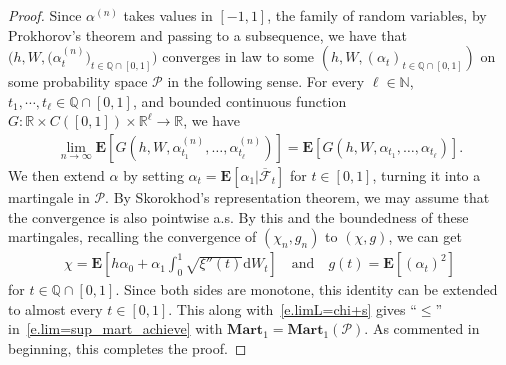 \documentclass[11pt]{amsart}
\theoremstyle{remark}
\theoremstyle{definition}
\numberwithin{equation}{section}
\numberwithin{proposition}{section}
\numberwithin{figure}{section}
\numberwithin{table}{section}
\newcommand{\N}{\mathbb{N}}
\newcommand{\Q}{\mathbb{Q}}
\newcommand{\R}{\mathbb{R}}
\newcommand{\EE}{\mathbf{E}}
\renewcommand{\leq}{\leqslant}
\renewcommand{\bar}{\overline}
\newcommand{\Ll}{\left}
\newcommand{\Rr}{\right}
\renewcommand{\d}{\mathrm{d}}
\newcommand{\1}{\mathbf{1}}
\newcommand{\mcl}{\mathcal}
\newcommand{\msc}{\mathscr}
\newcommand{\bmart}{\mathbf{Mart}}
\newcommand{\pnp}{{(n)}}
\begin{document}
\begin{proof}
Since $\alpha^\pnp$ takes values in $[-1,1]$, the family of random variables, by Prokhorov's theorem and passing to a subsequence, we have that $\big(h,W,\big(\alpha^\pnp_t\big)_{t\in\Q\cap[0,1]}\big)$ converges in law to some $\Ll(h,W,\Ll(\alpha_t\Rr)_{t\in\Q\cap[0,1]}\Rr)$ on some probability space $\msc P$ in the following sense. For every $\ell\in\N$,  $t_1,\cdots, t_\ell \in \Q\cap [0,1]$, and bounded continuous function $G:\R\times C([0,1])\times \R^\ell\to\R$, we have
\begin{align}\label{e.limE[G(W...)=}
    \lim_{n\to\infty} \EE \Ll[G\Ll(h,W, \alpha^\pnp_{t_1},\dots ,\alpha^\pnp_{t_\ell}\Rr)\Rr] = \EE \Ll[G\Ll(h,W, \alpha_{t_1},\dots ,\alpha_{t_\ell}\Rr)\Rr]. 
\end{align}
We then extend $\alpha$ by setting $\alpha_t= \EE \Ll[\alpha_1 |\bar{\mcl F}_t\Rr]$ for $t\in[0,1]$, turning it into a martingale in $\msc P$. By Skorokhod's representation theorem, we may assume that the convergence is also pointwise a.s. By this and the boundedness of these martingales, recalling the convergence of $(\chi_n,g_n)$ to $(\chi,g)$, we can get
\begin{align}\label{e.chi=,g=}
    \chi=\EE\Ll[h\alpha_0 + \alpha_1\int_0^1\sqrt{\xi''(t)}\d W_t\Rr] \quad\text{and}\quad 
    g(t)  =\EE \Ll[\Ll(\alpha_t\Rr)^2\Rr]
\end{align}
for $t\in \Q\cap [0,1]$. Since both sides are monotone, this identity can be extended to almost every $t\in[0,1]$. This along with~\eqref{e.limL=chi+s} gives ``$\leq$'' in~\eqref{e.lim=sup_mart_achieve} with $\bmart_1 = \bmart_1(\msc P)$.
As commented in beginning, this completes the proof.
\end{proof}
\end{document}
